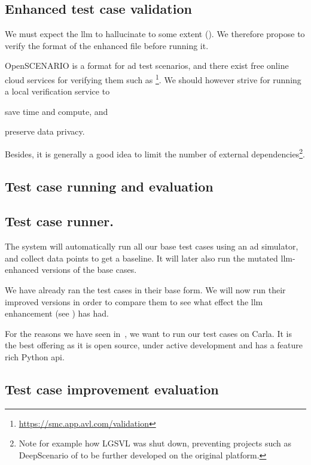 \subsection{Enhanced test case validation}

We must expect the \acrshort{llm} to hallucinate to some extent (). We
therefore propose to verify the format of the enhanced file before running it.

OpenSCENARIO is a format for \acrshort{ad} test scenarios, and there exist free
online cloud services for verifying them such as
\footnote{\url{https://smc.app.avl.com/validation}}. We should however strive for
running a local verification service to \begin{inparaenum}
    \item save time and compute,
    and
    \item preserve data privacy.
\end{inparaenum}

Besides, it is generally a good idea to limit the number of external dependencies\footnote{Note for
    example how LGSVL\cite{lgsvl} was shut down, preventing projects such as DeepScenario of
    \citeauthor{DeepScenario} to be further developed on the original platform.}.

\subsection*{Test case running and evaluation}

\subsection{Test case runner.}

The system will automatically run all
our base test cases using an \acrshort{ad} simulator, and collect data points to get a baseline. It
will later also run the mutated \acrshort{llm}-enhanced versions of the base cases.

We have already ran the test cases in their base form. We will now run their
improved versions in order to compare them to see what effect the \acrshort{llm}
enhancement (see ) has had.

For the reasons we have seen in~, we want to run our
test cases on Carla. It is the best offering as it is open source, under active
development and has a feature rich Python \acrshort{api}.

\subsection{Test case improvement evaluation}\label{sec:testCaseEval}

